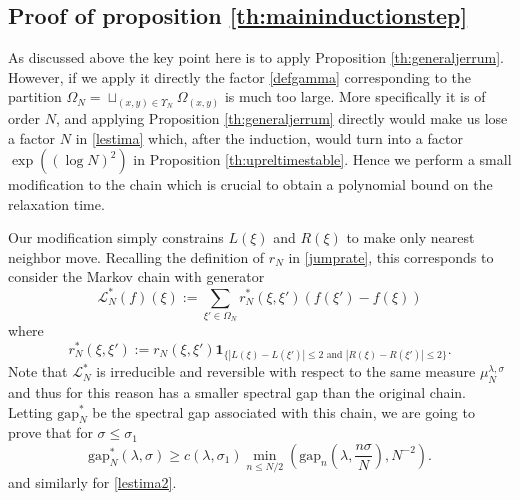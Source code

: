 \documentclass[reqno,11pt]{amsart}
\numberwithin{equation}{section}
\newcommand{\gO}{\Omega}
\newcommand{\gl}{\lambda}
\newcommand{\cL}{{\ensuremath{\mathcal L}} }
\newcommand{\ind}{\mathbf{1}}
\newcommand{\Gap}{\mathrm{gap}}
\begin{document}
\subsection{Proof of proposition \ref{th:maininductionstep}}



As discussed above the key point here is to apply Proposition \ref{th:generaljerrum}.
However, if we apply it directly the factor \eqref{defgamma} corresponding to the partition  $\gO_N= \sqcup_{(x,y)\in \Upsilon_N} \gO_{(x,y)}$ is much too large. More specifically it is of order $N$, and applying Proposition \ref{th:generaljerrum} directly would make us lose a factor $N$ in \eqref{lestima} which, after the induction, would turn into a factor $\exp((\log N)^2)$ in Proposition \ref{th:upreltimestable}. Hence we perform a small modification to the chain which is crucial to obtain a polynomial bound on the relaxation time.

\medskip

Our modification simply constrains $L(\xi)$ and $R(\xi)$ to make only nearest neighbor move.
 Recalling the definition of $r_N$ in \eqref{jumprate}, this corresponds to consider the Markov chain with generator 
 $$\cL^{*}_N(f)(\xi):=  \sum_{\xi'\in \gO_N}   r^*_N(\xi,\xi') (f(\xi')-f(\xi))$$
 where
 \begin{equation}\label{defstar}
  r^*_N(\xi,\xi'):=   r_N(\xi,\xi')\ind_{\{|L(\xi)-L(\xi')|\le 2 \text{ and } |R(\xi)-R(\xi')|\le 2\}}.
 \end{equation}
Note that $\cL^*_N$ is irreducible and  reversible with respect to the same measure $\mu^{\gl,\sigma}_N$
and thus for this reason has a smaller spectral gap than the original chain. 
Letting $\Gap^*_N$ be the spectral gap associated with this chain, we are going to prove that for $\sigma\le \sigma_1$
\begin{equation}
\Gap^*_{N}(\gl,\sigma)\ge c(\gl,\sigma_1) \min_{n\le N/2}  \left( \Gap_{n}\left(\gl,\frac{n\sigma}{N}\right), N^{-2}\right).
\end{equation}
and similarly for \eqref{lestima2}.

\medskip
\end{document}
